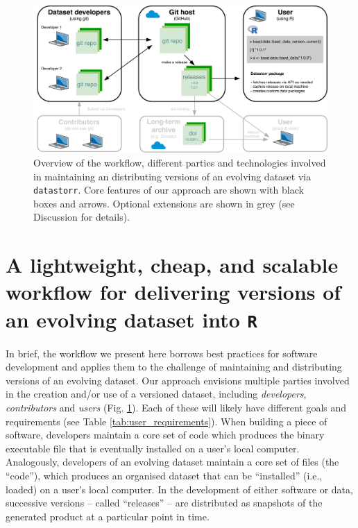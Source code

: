 \documentclass[a4paper,num-refs]{assets/oup-contemporary}
\begin{document}
\begin{figure}[!hb]
\centering
\includegraphics[width=\linewidth]{figures/Figure-stack.pdf}
\caption{Overview of the workflow, different parties and technologies involved in maintaining an distributing versions of an evolving dataset via \texttt{datastorr}.  Core features of our approach are shown with black boxes and arrows. Optional extensions are shown in grey (see Discussion for details).}
\label{fig:technology_stack}
\end{figure}

\section{A lightweight, cheap, and scalable workflow for delivering versions of an evolving dataset into \texttt{R}}

In brief, the workflow we present here borrows best practices for software development \cite{Perez-Riverol-2016} and applies them to the challenge of maintaining and distributing versions of an evolving dataset. Our approach envisions multiple parties involved in the creation and/or use of a versioned dataset, including \emph{developers}, \emph{contributors} and \emph{users} (Fig. \ref{fig:technology_stack}). Each of these will likely have different goals and requirements (see Table \ref{tab:user_requirements}). When building a piece of software, developers maintain a core set of code which produces the binary executable file that is eventually installed on a user's local computer. Analogously, developers of an evolving dataset maintain a core set of files (the ``code''), which produces an organised dataset that can be ``installed'' (i.e., loaded) on a user's local computer. In the development of either software or data, successive versions -- called ``releases'' -- are distributed as snapshots of the generated product at a particular point in time. 
\end{document}
